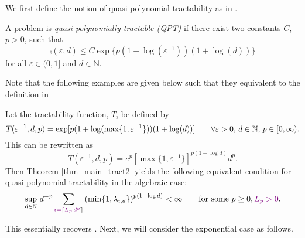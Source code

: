 \documentclass[sort&compress]{elsarticle}
\newcommand{\peter}[1]{\begingroup\color{violet}#1\endgroup}
\newcommand{\kachi}[1]{\begingroup\color{ForestGreen}#1\endgroup}
\begin{document}
\kachi{We first define the notion of quasi-polynomial tractability as in \cite{GneWoz11a}.
\begin{definition}
     A problem is \emph{quasi-polynomially tractable (QPT)} if there exist two constants $C$, $p > 0$, such that
\begin{equation}\label{expqpt}
    \comp(\varepsilon,d) \leq C\exp\{p(1+\log(\varepsilon^{-1}))(1+\log(d))\}
\end{equation}
for all $\varepsilon \in (0,1]$ and $d\in\mathbb{N}$.
\end{definition}
Note that the following examples are given below such that they equivalent to the definition in \cite{GneWoz11a}
}

\begin{example} 


Let the tractability function, $T$,
be defined by
\[
 T(\varepsilon^{-1},d,p)= \exp[ p(1+\log(\max\{1,\varepsilon^{-1}\}))(1+\log (d))]  \qquad \forall \varepsilon > 0, \,  d \in \mathbb{N}, \, p \in [0,\infty).
\]
This can be rewritten as 
\[
T(\varepsilon^{-1},d,p) = e^p[\max\{1,\varepsilon^{-1}\}]^{p(1+\log d)}d^p.
\]
Then Theorem \ref{thm_main_tract2} yields the following equivalent condition for quasi-polynomial tractability in the algebraic case:
\[
\sup_{d\in\mathbb{N}}\,d^{-p}\sum_{\peter{i=\lceil L_p\,d^{p}}\rceil} \left(\min\{1,\lambda_{i,d}\} \right)^{p(1+\log d)} < \infty \qquad \text{for some } p \geq 0, \peter{L_p >0}.\]
\end{example}
\peter{This essentially recovers \cite[Theorem 23.1]{NovWoz12a}.
}
Next, we will consider the exponential case as follows.
\end{document}
